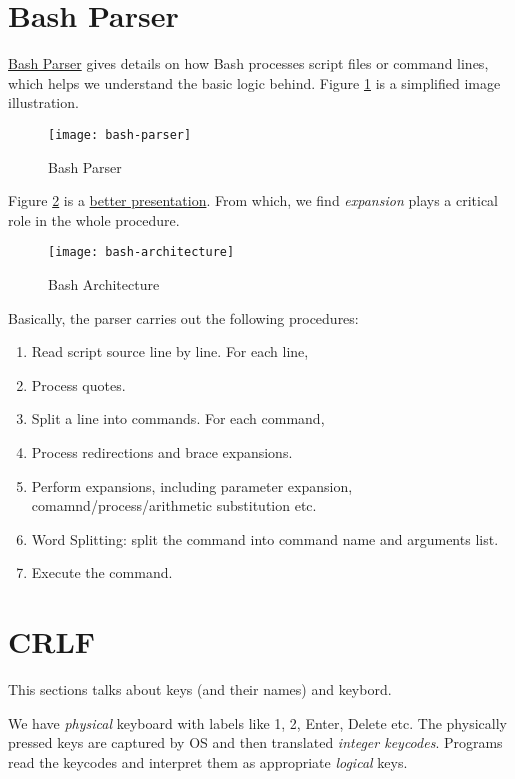 \section{Bash Parser}
\label{sec:bash-parser}

\href{http://mywiki.wooledge.org/BashParser}{Bash Parser} gives details
on how Bash processes script files or command lines, which helps
we understand the basic logic behind. Figure \ref{fig:bash-parser}
is a simplified image illustration.

\begin{figure}[!htbp]
  \centering
  \texttt{[image: bash-parser]}
  \caption{Bash Parser}
  \label{fig:bash-parser}
\end{figure}

Figure \ref{fig:bash-architecture} is a
\href{http://aosabook.org/en/bash.html}{better presentation}. From
which, we find \textit{expansion} plays a critical role in the
whole procedure.

\begin{figure}
  \centering
  \texttt{[image: bash-architecture]}
  \caption{Bash Architecture}
  \label{fig:bash-architecture}
\end{figure}

Basically, the parser carries out the following procedures:

\begin{enumerate}
\item Read script source line by line. For each line, 
\item Process quotes.
\item Split a line into commands. For each command,
\item Process redirections and brace expansions.
\item Perform expansions, including parameter expansion,
  comamnd/process/arithmetic substitution etc.
\item Word Splitting: split the command into command name and arguments list.
\item Execute the command.
\end{enumerate}

\section{CRLF}
\label{sec:crlf}

This sections talks about keys (and their names) and keybord.

We have \textit{physical} keyboard with labels like 1, 2, Enter,
Delete etc. The physically pressed keys are captured by OS and
then translated \textit{integer keycodes}. Programs read the
keycodes and interpret them as appropriate \textit{logical}
keys.

